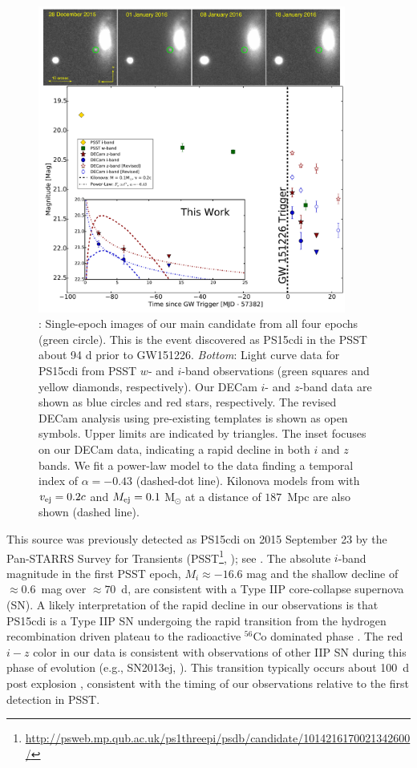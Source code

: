 \begin{figure}[t!]
\centering
	\includegraphics[width=0.9\textwidth]{./figs/chapter4/fig2.pdf}
\caption{: Single-epoch images of our main candidate
from all four epochs (green circle). This is the event discovered as PS15cdi in
the PSST about 94 d prior to GW151226. {\it Bottom}: Light
curve data for PS15cdi from PSST $w$- and $i$-band
observations (green squares and yellow diamonds, respectively).
Our DECam $i$- and $z$-band data are shown as
blue circles and red stars, respectively. The revised DECam analysis 
using pre-existing templates is shown as open symbols. Upper
limits are indicated by triangles. The inset focuses on our
DECam data, indicating a rapid decline in both $i$ and $z$
bands.  We fit a power-law model to the data finding a temporal index of 
$\alpha = -0.43$ (dashed-dot line). Kilonova models from \citet{BarnesKasen13} with $v_{\rm ej}=0.2c$ and $M_{\rm ej}=0.1$ M$_\odot$ 
at a distance of $187$~Mpc are also shown (dashed line).}
\label{fig:ch4_PS15cdi}
\end{figure}

This source was previously detected as PS15cdi on 2015 September 23 by the Pan-STARRS 
Survey for Transients (PSST\footnote{\singlespace \url{http://psweb.mp.qub.ac.uk/ps1threepi/psdb/candidate/1014216170021342600/}},
\citealt{Huber+15}); see . The absolute $i$-band 
magnitude in the first PSST epoch, $M_i\approx -16.6$ mag and the shallow decline of $\approx0.6$~mag 
over $\approx70$~d, are consistent with a Type IIP core-collapse supernova (SN). 
A likely interpretation of the rapid decline in our observations is that PS15cdi is a Type IIP SN undergoing 
the rapid transition from the hydrogen recombination driven plateau to the radioactive $^{56}$Co dominated 
phase \citep{KasenWoosley09,Sanders+15,Dhungana+16}. The red $i-z$ color in our data is consistent with observations 
of other IIP SN during this phase of evolution (e.g., SN2013ej, \citealt{Dhungana+16}).
This transition typically occurs about 100~d post explosion \citep{KasenWoosley09,Sanders+15,Dhungana+16}, consistent with the 
timing of our observations relative to the first detection in PSST.

